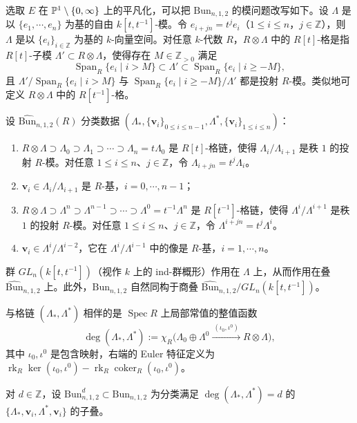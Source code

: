 选取 $E$ 在 $\mathbb{P}^1\setminus\{0,\infty\}$ 上的平凡化，可以把 $\mathrm{Bun}_{n,1,2}$ 的模问题改写如下。设 $\Lambda$ 是以 $\{e_1,\cdots,e_n\}$ 为基的自由 $k[t,t^{-1}]$-模。令 $e_{i+jn}=t^je_i$（$1\le i\le n$，$j\in\mathbb{Z}$），则 $\Lambda$ 是以 $\{e_i\}_{i\in\mathbb{Z}}$ 为基的 $k$-向量空间。对任意 $k$-代数 $R$，$R\otimes\Lambda$ 中的 $R[t]$-格是指 $R[t]$-子模 $\Lambda'\subset R\otimes\Lambda$，使得存在 $M\in\mathbb{Z}_{>0}$ 满足
\[
\operatorname{Span}_R\{e_i\mid i>M\}\subset\Lambda'\subset\operatorname{Span}_R\{e_i\mid i\ge -M\},
\]
且 $\Lambda'/\operatorname{Span}_R\{e_i\mid i>M\}$ 与 $\operatorname{Span}_R\{e_i\mid i\ge-M\}/\Lambda'$ 都是投射 $R$-模。类似地可定义 $R\otimes\Lambda$ 中的 $R[t^{-1}]$-格。

设 $\widehat{\mathrm{Bun}}_{n,1,2}(R)$ 分类数据 $(\Lambda_*,\{\mathbf v_i\}_{0\le i\le n-1},\Lambda^*,\{\mathbf v_i\}_{1\le i\le n})$：
\begin{enumerate}[label=(\arabic*), leftmargin=1.9em, itemsep=.15em]
\item $R\otimes\Lambda\supset\Lambda_0\supset\Lambda_1\supset\cdots\supset\Lambda_n=t\Lambda_0$ 是 $R[t]$-格链，使得 $\Lambda_i/\Lambda_{i+1}$ 是秩 $1$ 的投射 $R$-模。对任意 $1\le i\le n$、$j\in\mathbb{Z}$，令 $\Lambda_{i+jn}=t^j\Lambda_i$。
\item $\mathbf v_i\in\Lambda_i/\Lambda_{i+1}$ 是 $R$-基，$i=0,\cdots,n-1$；
\item $R\otimes\Lambda\supset\Lambda^n\supset\Lambda^{n-1}\supset\cdots\supset\Lambda^0=t^{-1}\Lambda^n$ 是 $R[t^{-1}]$-格链，使得 $\Lambda^i/\Lambda^{i+1}$ 是秩 $1$ 的投射 $R$-模。对任意 $1\le i\le n$、$j\in\mathbb{Z}$，令 $\Lambda^{i+jn}=t^j\Lambda^i$。
\item $\mathbf v_i\in\Lambda^i/\Lambda^{i-2}$，它在 $\Lambda^i/\Lambda^{i-1}$ 中的像是 $R$-基，$i=1,\cdots,n$。
\end{enumerate}
群 $GL_n(k[t,t^{-1}])$（视作 $k$ 上的 ind-群概形）作用在 $\Lambda$ 上，从而作用在叠 $\widehat{\mathrm{Bun}}_{n,1,2}$ 上。此外，$\mathrm{Bun}_{n,1,2}$ 自然同构于商叠 $\widehat{\mathrm{Bun}}_{n,1,2}/GL_n(k[t,t^{-1}])$。

与格链 $(\Lambda_*,\Lambda^*)$ 相伴的是 $\operatorname{Spec}R$ 上局部常值的整值函数
\[
\deg(\Lambda_*,\Lambda^*):=\chi_R\Big(\Lambda_0\oplus\Lambda^0\xrightarrow{\ (\iota_0,\iota^0)\ }R\otimes\Lambda\Big),
\]
其中 $\iota_0,\iota^0$ 是包含映射，右端的 Euler 特征定义为 $\operatorname{rk}_R\ker(\iota_0,\iota^0)-\operatorname{rk}_R\operatorname{coker}_R(\iota_0,\iota^0)$。

对 $d\in\mathbb{Z}$，设 $\mathrm{Bun}^d_{n,1,2}\subset\mathrm{Bun}_{n,1,2}$ 为分类满足 $\deg(\Lambda_*,\Lambda^*)=d$ 的 $\{\Lambda_*,\mathbf v_i,\Lambda^*,\mathbf v_i\}$ 的子叠。

